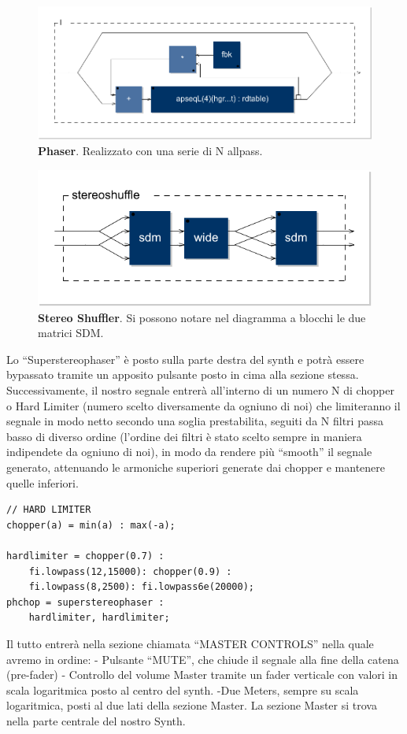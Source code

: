 \documentclass[
	a4paper,
	twocolumn
	]{article}
\begin{document}
\begin{figure}[h]
\begin{center}
\includegraphics[width=.47\textwidth]{img/phaser}
\caption{\textbf{Phaser}. Realizzato con una serie di N allpass.}
\label{phaser}
\end{center}
\end{figure}

\begin{figure}[h]
\begin{center}
\includegraphics[width=.47\textwidth]{img/mid-side-shuffler}
\caption{\textbf{Stereo Shuffler}. Si possono notare nel diagramma a blocchi le due matrici SDM.}
\label{stereoshuffler}
\end{center}
\end{figure}

Lo “Superstereophaser” è posto sulla parte destra del synth e potrà essere bypassato tramite un apposito pulsante posto in cima alla sezione stessa.
Successivamente, il nostro segnale entrerà all’interno di un numero N di chopper o Hard Limiter (numero scelto diversamente da ogniuno di noi) che limiteranno il segnale in modo netto secondo una soglia prestabilita, seguiti da N filtri passa basso di diverso ordine (l'ordine dei filtri è stato scelto sempre in maniera indipendete da ogniuno di noi), in modo da rendere più “smooth” il segnale generato, attenuando le armoniche superiori generate dai chopper e mantenere quelle inferiori.

\begin{lstlisting}
// HARD LIMITER
chopper(a) = min(a) : max(-a);

hardlimiter = chopper(0.7) :
	fi.lowpass(12,15000): chopper(0.9) :
	fi.lowpass(8,2500): fi.lowpass6e(20000);
phchop = superstereophaser :
	hardlimiter, hardlimiter;
 \end{lstlisting}

Il tutto entrerà nella sezione chiamata “MASTER CONTROLS” nella quale avremo in ordine:
- Pulsante “MUTE”, che chiude il segnale alla fine della catena (pre-fader)
- Controllo del volume Master tramite un fader verticale con valori in scala logaritmica posto al centro del synth.
-Due Meters, sempre su scala logaritmica, posti al due lati della sezione Master.
La sezione Master si trova nella parte centrale del nostro Synth.
\end{document}
